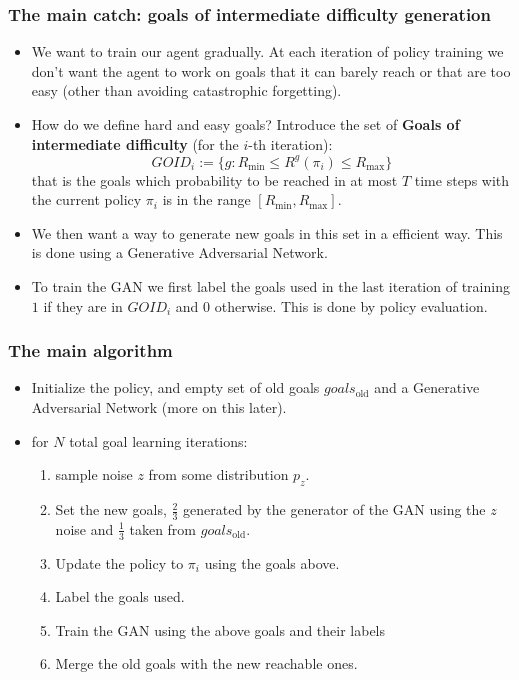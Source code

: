 \documentclass{beamer}
\theoremstyle{plain}
\theoremstyle{definition}
\theoremstyle{remark}
\begin{document}
\begin{frame}
	\frametitle{The main catch: goals of intermediate difficulty generation}
	\begin{itemize}
		\item We want to train our agent gradually. At each iteration of policy training we don't want the agent to work on goals that it can barely reach or that are too easy (other than avoiding catastrophic forgetting).
  		\item How do we define hard and easy goals? Introduce the set of \textbf{Goals of intermediate difficulty} (for the $i$-th iteration):
			\begin{equation*}
				GOID_i := \{g: R_{\text{min}}\leq R^g(\pi_i)\leq R_{\text{max}}\}
			\end{equation*}
			that is the goals which probability to be reached in at most $T$ time steps with the current policy $\pi_i$ is in the range $[R_{\text{min}},R_{\text{max}}]$.
		\item We then want a way to generate new goals in this set in a efficient way. This is done using a Generative Adversarial Network.
  		\item To train the GAN we first label the goals used in the last iteration of training $1$ if they are in $GOID_i$ and $0$ otherwise. This is done by policy evaluation.
	\end{itemize}
\end{frame}

\begin{frame}
	\frametitle{The main algorithm}
	\begin{itemize}
		\item Initialize the policy, and empty set of old goals $goals_{\text{old}}$ and a Generative Adversarial Network (more on this later).
		\item for $N$ total goal learning iterations:
		\begin{enumerate}
			\item sample noise $z$ from some distribution $p_z$.
			\item Set the new goals, $\frac{2}{3}$ generated by the generator of the GAN using the $z$ noise and $\frac{1}{3}$ taken from $goals_{\text{old}}$.
			\item Update the policy to $\pi_i$ using the goals above.
			\item Label the goals used.
			\item Train the GAN using the above goals and their labels
			\item Merge the old goals with the new reachable ones.
		\end{enumerate}
	\end{itemize}	
\end{frame}
\end{document}
